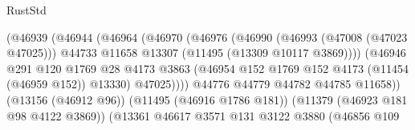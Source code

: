 \begin{lexlean}{RustStd}
\begin{coremodule}
                                              (@46939
                                                (@46944
                                                  (@46964
                                                    (@46970
                                                      (@46976
                                                        (@46990
                                                          (@46993 (@47008 (@47023 @47025)))
                                                          @44733
                                                          @11658
                                                          @13307
                                                          (@11495 (@13309 @10117 @3869))))
                                                      (@46946
                                                        @291
                                                        @120
                                                        @1769
                                                        @28
                                                        @4173
                                                        @3863
                                                        (@46954
                                                          @152
                                                          @1769
                                                          @152
                                                          @4173
                                                          (@11454 (@46959 @152))
                                                          @13330)
                                                        @47025))))
                                                @44776
                                                @44779
                                                @44782
                                                @44785
                                                @11658))
                                            (@13156 (@46912 @96))
                                            (@11495 (@46916 @1786 @181))
                                            (@11379 (@46923 @181 @98 @4122 @3869))
                                            (@13361
                                              @46617
                                              @3571
                                              @131
                                              @3122
                                              @3880
                                              (@46856
                                                @109

\end{coremodule}
\end{lexlean}
